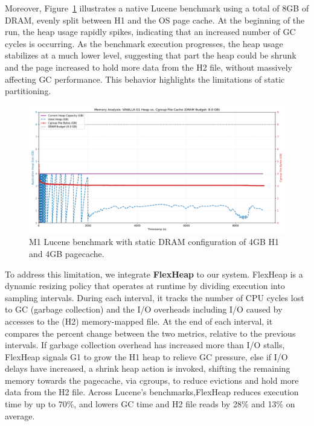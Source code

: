 Moreover, Figure~\ref{fig:vanilla-dram-underutilization} illustrates a native
Lucene benchmark using a total of 8GB of DRAM, evenly split between H1 and the
OS page cache. At the beginning of the run, the heap usage rapidly spikes,
indicating that an increased number of GC cycles is occurring. As the benchmark execution progresses, the heap usage
stabilizes at a much lower level, suggesting that part the heap could be shrunk 
and the page increased to hold more data from the H2 file, without massively affecting GC
performance. This behavior highlights the limitations of static partitioning.
\begin{figure}[htbp]
	\centering
	\includegraphics[width=1\linewidth]{fig/combined_memory_timeline_vanilla_g1.png}
	\caption{
		M1 Lucene benchmark with static DRAM configuration of 4GB H1 and 4GB pagecache.
	}
	\label{fig:vanilla-dram-underutilization}
\end{figure}

To address this limitation, we integrate \textbf{FlexHeap} to our system.
FlexHeap is a dynamic resizing policy that operates at runtime by
dividing execution into sampling intervals. During each interval, it tracks the
number of CPU cycles lost to GC (garbage collection) and the I/O overheads including I/O caused by
accesses to the (H2) memory-mapped file. At the end of each interval, it compares the percent 
change between the two metrics, relative to the previous intervals. If garbage
collection overhead has increased more than I/O stalls, FlexHeap signals G1 to grow
the H1 heap to relieve GC pressure, else if I/O delays have increased,
a shrink heap action is invoked, shifting the remaining memory towards the pagecache, via cgroups, to reduce evictions and hold 
more data from the H2 file. Across Lucene's benchmarks,FlexHeap reduces execution time by
up to 70\%, and lowers GC time and H2 file reads by 28\% and 13\% on average.


